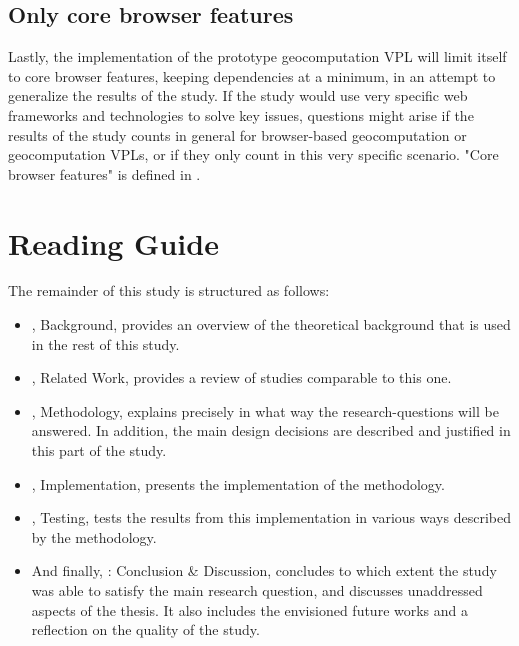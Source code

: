 \subsection*{Only core browser features}
Lastly, the implementation of the prototype geocomputation VPL will limit itself to core browser features, keeping dependencies at a minimum, in an attempt to generalize the results of the study.
If the study would use very specific web frameworks and technologies to solve key issues, questions might arise if the results of the study counts in general for browser-based geocomputation or geocomputation VPLs, or if they only count in this very specific scenario. 
"Core browser features" is defined in .

\newpage
\section{Reading Guide}
The remainder of this study is structured as follows:


\begin{itemize}[ ]
  \item {}, Background, provides an overview of the theoretical background that is used in the rest of this study.
  
  \item {}, Related Work, provides a review of studies comparable to this one.

  \item {}, Methodology, explains precisely in what way the research-questions will be answered.
  In addition, the main design decisions are described and justified in this part of the study.

  \item {}, Implementation, presents the implementation of the methodology.
  
  \item {}, Testing, tests the results from this implementation in various ways described by the methodology.
  
  \item And finally, : Conclusion \& Discussion, concludes to which extent the study was able to satisfy the main research question, and discusses unaddressed aspects of the thesis.
  It also includes the envisioned future works and a reflection on the quality of the study.

\end{itemize}